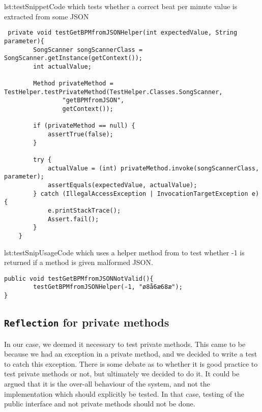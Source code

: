 \begin{code}{lst:testSnippet}{Code which tests whether a correct beat per minute value is extracted from some JSON}
\begin{lstlisting}
 private void testGetBPMfromJSONHelper(int expectedValue, String parameter){
        SongScanner songScannerClass = SongScanner.getInstance(getContext());
        int actualValue;

        Method privateMethod = TestHelper.testPrivateMethod(TestHelper.Classes.SongScanner,
                "getBPMfromJSON",
                getContext());

        if (privateMethod == null) {
            assertTrue(false);
        }

        try {
            actualValue = (int) privateMethod.invoke(songScannerClass, parameter);
            assertEquals(expectedValue, actualValue);
        } catch (IllegalAccessException | InvocationTargetException e) {
            e.printStackTrace();
            Assert.fail();
        }
    }
\end{lstlisting}
\end{code}
\begin{code}{lst:testSnipUsage}{Code which uses a helper method from  to test whether -1 is returned if a method is given malformed JSON.}
\begin{lstlisting}
public void testGetBPMfromJSONNotValid(){
        testGetBPMfromJSONHelper(-1, "ø8å6æ68æ");
}
\end{lstlisting}
\end{code}

\subsection{\texttt{Reflection} for private methods}\label{sec:privTest}
In our case, we deemed it necessary to test private methods. This came to be because we had an exception in a private method, and we decided to write a test to catch this exception. There is some debate as to whether it is good practice to test private methods or not, but ultimately we decided to do it. It could be argued that it is the over-all behaviour of the system, and not the implementation which should explicitly be tested. In that case, testing of the public interface and not private methods should not be done.
% 